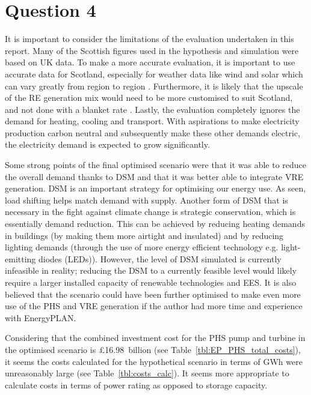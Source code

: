 \section{Question 4}

It is important to consider the limitations of the evaluation undertaken in this report.
Many of the Scottish figures used in the hypothesis and simulation
were based on UK data.
To make a more accurate evaluation, it is important to use accurate data for Scotland, especially for weather data like wind and solar which can vary greatly from region to region \citep{Muller2015}.
Furthermore, it is likely that the upscale of the RE generation mix would need to be more customised to suit Scotland, and not done with a blanket rate \citep{Muller2015}.
Lastly, the evaluation completely ignores the demand for heating, cooling and transport.
With aspirations to make electricity production carbon neutral and subsequently make these other demands electric,
the electricity demand is expected to grow significantly.

Some strong points of the final optimised scenario were that it was able to reduce the overall demand thanks to DSM and that it was better able to integrate VRE generation.
DSM is an important strategy for optimising our energy use.
As seen, load shifting helps match demand with supply.
Another form of DSM that is necessary in the fight against climate change is strategic conservation, which is essentially demand reduction.
This can be achieved by reducing heating demands in buildings (by making them more airtight and insulated) and by reducing lighting demands (through the use of more energy efficient technology e.g. light-emitting diodes (LEDs)).
However, the level of DSM simulated is currently infeasible in reality; reducing the DSM to a currently feasible level would likely require a larger installed capacity of renewable technologies and EES.
It is also believed that the scenario could have been further optimised to make even more use of the PHS and VRE generation if the author had more time and experience with EnergyPLAN.

Considering that the combined investment cost for the PHS pump and turbine in the optimised scenario is £16.98~billion (see Table~\ref{tbl:EP_PHS_total_costs}), it seems the costs calculated for the hypothetical scenario in terms of GWh were unreasonably large (see Table~\ref{tbl:costs_calc}).
It seems more appropriate to calculate costs in terms of power rating as opposed to storage capacity.

